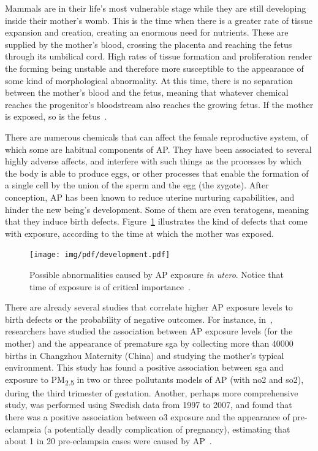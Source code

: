 Mammals are in their life's most vulnerable stage while they are still
developing inside their mother's womb. This is the time when there is a
greater rate of tissue expansion and creation, creating an enormous need
for nutrients. These are supplied by the mother's blood, crossing the
placenta and reaching the fetus through its umbilical cord. High rates
of tissue formation and proliferation render the forming being unstable
and therefore more susceptible to the appearance of some kind of
morphological abnormality. At this time, there is no separation between
the mother's blood and the fetus, meaning that whatever chemical reaches
the progenitor's bloodstream also reaches the growing fetus. If the
mother is exposed, so is the fetus~\cite{Vallero2014}.

There are numerous chemicals that can affect the female reproductive
system, of which some are habitual components of \gls{AP}. They have
been associated to several highly adverse affects, and interfere with
such things as the processes by which the body is able to produce eggs,
or other processes that enable the formation of a single cell by the
union of the sperm and the egg (the zygote). After conception, \gls{AP}
has been known to reduce uterine nurturing capabilities, and hinder the
new being's development. Some of them are even teratogens, meaning that
they induce birth defects. Figure~\ref{fig:AP_in_utero} illustrates the
kind of defects that come with exposure, according to the time at which
the mother was exposed.

\begin{figure}[htpb]
    \centering
    \texttt{[image: img/pdf/development.pdf]}
    \caption{Possible abnormalities caused by \gls{AP} exposure \emph{in
    utero}. Notice that time of exposure is of critical
    importance~\cite{Vallero2014}.}
    \label{fig:AP_in_utero}
\end{figure}

There are already several studies that correlate higher \gls{AP}
exposure levels to birth defects or the probability of negative
outcomes. For instance, in~\cite{Li2019}, researchers have studied the
association between \gls{AP} exposure levels (for the mother) and the
appearance of premature \gls{sga} by collecting more than 40000 births
in Changzhou Maternity (China) and studying the mother's typical
environment. This study has found a positive association between
\gls{sga} and exposure to \gls{PM}\textsubscript{2.5} in two or three
pollutants models of \gls{AP} (with \gls{no2} and \gls{so2}), during the
third trimester of gestation. Another, perhaps more comprehensive study,
was performed using Swedish data from 1997 to 2007, and found that there
was a positive association between \gls{o3} exposure and the appearance
of pre-eclampsia (a potentially deadly complication of pregnancy),
estimating that about 1 in 20 pre-eclampsia cases were caused by
\gls{AP}~\cite{Olsson2013}.

